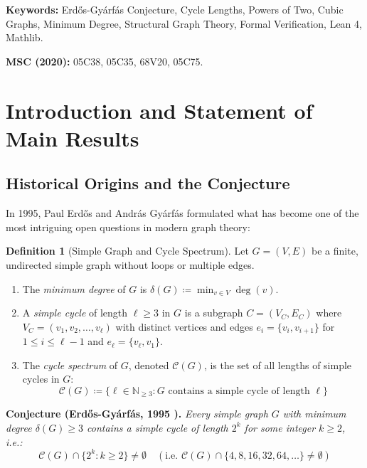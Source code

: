 \documentclass[11pt,a4paper]{article}
\theoremstyle{definition}
\newtheorem{definition}[theorem]{Definition}
\begin{document}
\vspace{0.5em}
\noindent\textbf{Keywords:} Erd\H{o}s-Gy\'arf\'as Conjecture, Cycle Lengths, Powers of Two, Cubic Graphs, Minimum Degree, Structural Graph Theory, Formal Verification, Lean 4, Mathlib.

\noindent\textbf{MSC (2020):} 05C38, 05C35, 68V20, 05C75.

\tableofcontents
\newpage

\section{Introduction and Statement of Main Results}

\subsection{Historical Origins and the Conjecture}
In 1995, Paul Erd\H{o}s and Andr\'as Gy\'arf\'as formulated what has become one of the most intriguing open questions in modern graph theory:

\begin{definition}[Simple Graph and Cycle Spectrum]\label{def:graph_cycle}
Let $G = (V, E)$ be a finite, undirected simple graph without loops or multiple edges.
\begin{enumerate}
    \item The \emph{minimum degree} of $G$ is $\delta(G) \coloneqq \min_{v \in V} \deg(v)$.
    \item A \emph{simple cycle} of length $\ell \ge 3$ in $G$ is a subgraph $C = (V_C, E_C)$ where $V_C = (v_1, v_2, \dots, v_\ell)$ with distinct vertices and edges $e_i = \{v_i, v_{i+1}\}$ for $1 \le i \le \ell - 1$ and $e_\ell = \{v_\ell, v_1\}$.
    \item The \emph{cycle spectrum} of $G$, denoted $\mathcal{C}(G)$, is the set of all lengths of simple cycles in $G$:
    \[ \mathcal{C}(G) \coloneqq \{ \ell \in \mathbb{N}_{\ge 3} : G \text{ contains a simple cycle of length } \ell \} \]
\end{enumerate}
\end{definition}

\noindent\textbf{Conjecture (Erd\H{o}s-Gy\'arf\'as, 1995 \cite{erdos1995}).} \textit{Every simple graph $G$ with minimum degree $\delta(G) \ge 3$ contains a simple cycle of length $2^k$ for some integer $k \ge 2$, i.e.:}
\begin{equation}\label{eq:eg_conjecture}
\mathcal{C}(G) \cap \{ 2^k : k \ge 2 \} \ne \emptyset \quad (\text{i.e. } \mathcal{C}(G) \cap \{4, 8, 16, 32, 64, \dots\} \ne \emptyset)
\end{equation}
\end{document}
